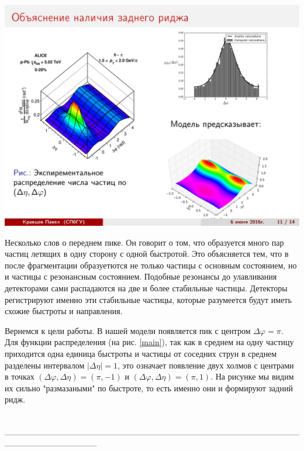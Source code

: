 \documentclass[14pt]{article}
\renewcommand{\phi}{\varphi}
\newcommand{\abs}[1]{\left| #1 \right|}
\renewcommand{\line}{\\ \_\_\_\_\_\_\_\_\_\_\_\_\_\_\_\_\_\_\_\_\_\_\_\_\_\_\_\_\_\_\_\_\_\_\_\_\_\_\_\_\_\_\_\_\_\_\_\_\_\_\_\_\_\_\_\_\_\_\_\_\_\_\_ \\ }
\begin{document}
\begin{minipage}[h]{0.3\linewidth}
\includegraphics[width=1\linewidth]{page-11.jpg}
\end{minipage}
\begin{minipage}[h]{0.65\linewidth}
Несколько слов о переднем пике. Он говорит о том, что образуется много пар частиц летящих в одну сторону с одной быстротой. Это объясняется тем, что в после фрагментации образуетются не только частицы с основным состоянием, но и частицы с резонансным состоянием. Подобные резонансы до улавливания детекторами сами распадаются на две и более стабильные частицы. Детекторы регистрируют именно эти стабильные частицы, которые разумеется будут иметь схожие быстроты и направления.

Вернемся к цели работы. 
В нашей модели появляется пик с центром $\Delta \phi = \pi$. Для  функции распределения (на рис. \ref{main}), так как в среднем на одну частицу приходится одна единица быстроты и частицы от соседних струн в среднем разделены интервалом $\abs{\Delta \eta} = 1$, это означает появление двух холмов с центрами в точках $(\Delta \phi , \Delta \eta) = (\pi, -1)$ и $(\Delta \phi , \Delta \eta) = (\pi, 1)$. На рисунке мы видим их сильно "размазаными" по быстроте, то есть именно они и формируют задний ридж.
\end{minipage}
\line
\end{document}
